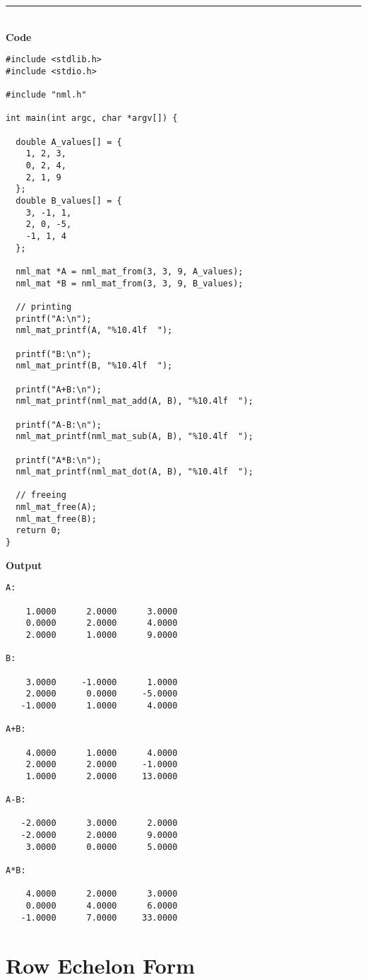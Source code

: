 \rule{80mm}{0.5pt}\\
{\bf Code}
\begin{verbatim}
#include <stdlib.h>
#include <stdio.h>

#include "nml.h"

int main(int argc, char *argv[]) {

  double A_values[] = {
    1, 2, 3,
    0, 2, 4,
    2, 1, 9
  };
  double B_values[] = {
    3, -1, 1,
    2, 0, -5,
    -1, 1, 4
  };

  nml_mat *A = nml_mat_from(3, 3, 9, A_values);
  nml_mat *B = nml_mat_from(3, 3, 9, B_values);

  // printing
  printf("A:\n");                       
  nml_mat_printf(A, "%10.4lf  ");

  printf("B:\n");                       
  nml_mat_printf(B, "%10.4lf  ");

  printf("A+B:\n");                       
  nml_mat_printf(nml_mat_add(A, B), "%10.4lf  ");

  printf("A-B:\n");                       
  nml_mat_printf(nml_mat_sub(A, B), "%10.4lf  ");

  printf("A*B:\n");                       
  nml_mat_printf(nml_mat_dot(A, B), "%10.4lf  ");

  // freeing
  nml_mat_free(A);    
  nml_mat_free(B);    
  return 0;
}
\end{verbatim}

\hsep
{\bf Output}
\begin{verbatim}
A:

    1.0000      2.0000      3.0000  
    0.0000      2.0000      4.0000  
    2.0000      1.0000      9.0000  

B:

    3.0000     -1.0000      1.0000  
    2.0000      0.0000     -5.0000  
   -1.0000      1.0000      4.0000  

A+B:

    4.0000      1.0000      4.0000  
    2.0000      2.0000     -1.0000  
    1.0000      2.0000     13.0000  

A-B:

   -2.0000      3.0000      2.0000  
   -2.0000      2.0000      9.0000  
    3.0000      0.0000      5.0000  

A*B:

    4.0000      2.0000      3.0000  
    0.0000      4.0000      6.0000  
   -1.0000      7.0000     33.0000  
\end{verbatim}

\section{Row Echelon Form}

